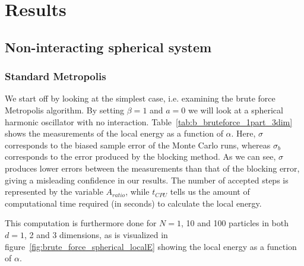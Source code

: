 \documentclass[
    a4paper, aps, twocolumn, floatfix, superscriptaddress,
    nofootinbib]{revtex4-1}
\begin{document}
\section{Results}\label{sec:Results}
\subsection{Non-interacting spherical system}
\subsubsection{Standard Metropolis}
We start off by looking at the simplest case, i.e. examining the brute force Metropolis algorithm. By setting $\beta = 1$ and $a=0$ we will look at a spherical harmonic oscillator with no interaction. Table~\ref{tab:b_bruteforce_1part_3dim} shows the measurements of the local energy as a function of $\alpha$. Here, $\sigma$ corresponds to the biased sample error of the Monte Carlo runs, whereas $\sigma_b$ corresponds to the error produced by the blocking method. As we can see, $\sigma$ produces lower errors between the measurements than that of the blocking error, giving a misleading confidence in our results. The number of accepted steps is represented by the variable $A_{ratio}$, while $t_{CPU}$ tells us the amount of computational time required (in seconds) to calculate the local energy.

This computation is furthermore done for $N = 1$, 10 and 100 particles in both $d = 1$, 2 and 3 dimensions, as is visualized in figure~\ref{fig:brute_force_spherical_localE} showing the local energy as a function of $\alpha$.


\end{document}
